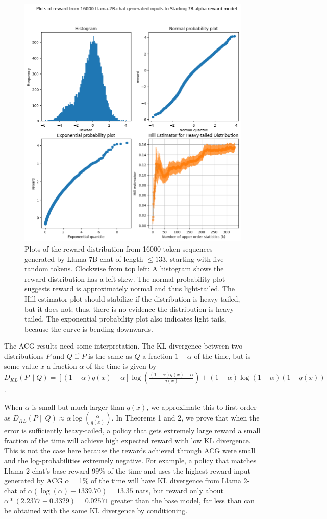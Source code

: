 \documentclass{article}
\theoremstyle{plain}
\theoremstyle{definition}
\theoremstyle{remark}
\begin{document}
\begin{figure}
    \centering
    \includegraphics[width=0.8\linewidth]{images/reward_plots_llama_starling_16k.png}
    \caption{Plots of the reward distribution from 16000 token sequences generated by Llama 7B-chat of length $\le 133$, starting with five random tokens. Clockwise from top left: A histogram shows the reward distribution has a left skew. The normal probability plot suggests reward is approximately normal and thus light-tailed. The Hill estimator plot should stabilize if the distribution is heavy-tailed, but it does not; thus, there is no evidence the distribution is heavy-tailed. The exponential probability plot also indicates light tails, because the curve is bending downwards. }
    \label{fig:starling-llama}
\end{figure}

The ACG results need some interpretation. The KL divergence between two distributions $P$ and $Q$ if $P$ is the same as $Q$ a fraction $1-\alpha$ of the time, but is some value $x$ a fraction $\alpha$ of the time is given by \(D_{KL}(P \| Q) = \left[(1-\alpha)q(x) + \alpha\right] \log \left(\frac{(1-\alpha)q(x) + \alpha}{q(x)}\right) + 
(1-\alpha) \log (1-\alpha) (1 - q(x))\).


When $\alpha$ is small but much larger than $q(x)$, we approximate this to first order as $D_{KL}(P \| Q) \approx \alpha \log \left(\frac{\alpha}{q(x)}\right)$. In Theorems 1 and 2, we prove that when the error is sufficiently heavy-tailed, a policy that gets extremely large reward a small fraction of the time will achieve high expected reward with low KL divergence. This is not the case here because the rewards achieved through ACG were small and the log-probabilities extremely negative. For example, a policy that matches Llama 2-chat's base reward 99\% of the time and uses the highest-reward input generated by ACG $\alpha=$1\% of the time will have KL divergence from Llama 2-chat of $\alpha(\log(\alpha) - 1339.70) = 13.35$ nats, but reward only about $\alpha*(2.2377-0.3329) = 0.02571$ greater than the base model, far less than can be obtained with the same KL divergence by conditioning.
\end{document}
